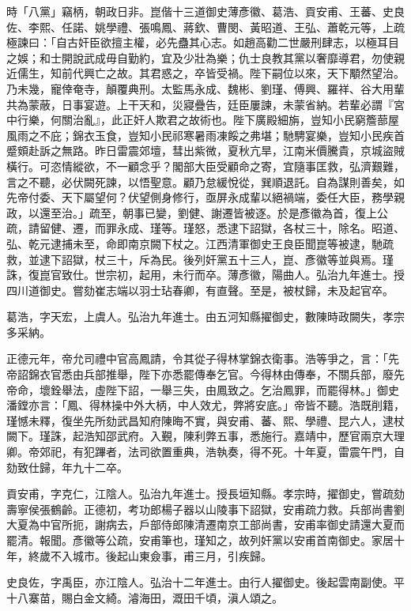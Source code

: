 \begin{pinyinscope}
時「八黨」竊柄，朝政日非。崑偕十三道御史薄彥徽、葛浩、貢安甫、王蕃、史良佐、李熙、任諾、姚學禮、張鳴鳳、蔣欽、曹閔、黃昭道、王弘、蕭乾元等，上疏極諫曰：「自古奸臣欲擅主權，必先蠱其心志。如趙高勸二世嚴刑肆志，以極耳目之娛；和士開說武成毋自勤約，宜及少壯為樂；仇士良教其黨以奢靡導君，勿使親近儒生，知前代興亡之故。其君惑之，卒皆受禍。陛下嗣位以來，天下顒然望治。乃未幾，寵倖奄寺，顛覆典刑。太監馬永成、魏彬、劉瑾、傅興、羅祥、谷大用輩共為蒙蔽，日事宴遊。上干天和，災寢疊告，廷臣屢諫，未蒙省納。若輩必謂『宮中行樂，何關治亂』，此正奸人欺君之故術也。陛下廣殿細旃，豈知小民窮簷蔀屋風雨之不庇；錦衣玉食，豈知小民祁寒暑雨凍餒之弗堪；馳騁宴樂，豈知小民疾首蹙頞赴訴之無路。昨日雷震郊壇，彗出紫微，夏秋亢旱，江南米價騰貴，京城盜賊橫行。可恣情縱欲，不一顧念乎？閣部大臣受顧命之寄，宜隨事匡救，弘濟艱難，言之不聽，必伏闕死諫，以悟聖意。顧乃怠緩悅從，巽順退託。自為謀則善矣，如先帝付委、天下屬望何？伏望側身修行，亟屏永成輩以絕禍端，委任大臣，務學親政，以還至治。」疏至，朝事已變，劉健、謝遷皆被逐。於是彥徽為首，復上公疏，請留健、遷，而罪永成、瑾等。瑾怒，悉逮下詔獄，各杖三十，除名。昭道、弘、乾元逮捕未至，命即南京闕下杖之。江西清軍御史王良臣聞崑等被逮，馳疏救，並逮下詔獄，杖三十，斥為民。後列奸黨五十三人，崑、彥徽等並與焉。瑾誅，復崑官致仕。世宗初，起用，未行而卒。薄彥徽，陽曲人。弘治九年進士。授四川道御史。嘗劾崔志端以羽士玷春卿，有直聲。至是，被杖歸，未及起官卒。

葛浩，字天宏，上虞人。弘治九年進士。由五河知縣擢御史，數陳時政闕失，孝宗多采納。

正德元年，帝允司禮中官高鳳請，令其從子得林掌錦衣衛事。浩等爭之，言：「先帝詔錦衣官悉由兵部推舉，陛下亦悉罷傳奉乞官。今得林由傳奉，不關兵部，廢先帝命，壞銓舉法，虛陛下詔，一舉三失，由鳳致之。乞治鳳罪，而罷得林。」御史潘鏜亦言：「鳳、得林操中外大柄，中人效尤，弊將安底。」帝皆不聽。浩既削籍，瑾憾未釋，復坐先所劾武昌知府陳晦不實，與安甫、蕃、熙、學禮、昆六人，逮杖闕下。瑾誅，起浩知邵武府。入覲，陳利弊五事，悉施行。嘉靖中，歷官兩京大理卿。帝郊祀，有犯蹕者，法司欲置重典，浩執奏，得不死。十年夏，雷震午門，自劾致仕歸，年九十二卒。

貢安甫，字克仁，江陰人。弘治九年進士。授長垣知縣。孝宗時，擢御史，嘗疏劾壽寧侯張鶴齡。正德初，考功郎楊子器以山陵事下詔獄，安甫疏力救。兵部尚書劉大夏為中官所扼，謝病去，戶部侍郎陳清遷南京工部尚書，安甫率御史請還大夏而罷清。報聞。彥徽等公疏，安甫筆也，瑾知之，故列奸黨以安甫首南御史。家居十年，終歲不入城市。後起山東僉事，甫三月，引疾歸。

史良佐，字禹臣，亦江陰人。弘治十二年進士。由行人擢御史。後起雲南副使。平十八寨苗，賜白金文綺。濬海田，溉田千頃，滇人頌之。


\end{pinyinscope}

